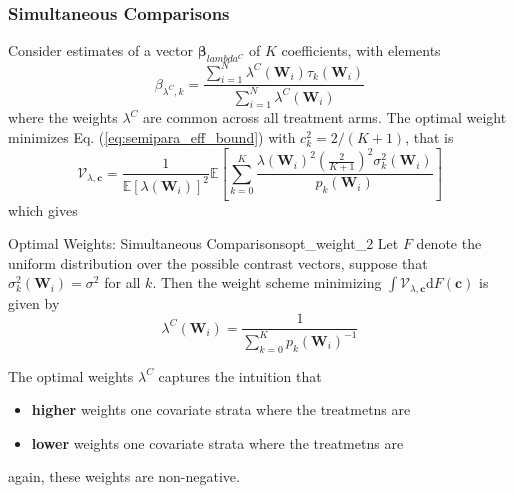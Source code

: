 \documentclass[twoside]{article}
\begin{document}
\subsubsection{Simultaneous Comparisons}
Consider estimates of a vector $\boldsymbol{\beta}_{lambda^C}$ of $K$ coefficients, with elements
$$
\beta_{\lambda^C,k} = \frac{\sum^N_{i=1}\lambda^C(\mathbf{W}_i)\tau_k(\mathbf{W}_i)}{\sum^N_{i=1}\lambda^C(\mathbf{W}_i)}
$$
where the weights $\lambda^C$ are common across all treatment arms. The optimal weight minimizes Eq. (\ref{eq:semipara_eff_bound}) with $c_k^2 = 2/(K+1)$, that is 
$$
\mathcal{V}_{\lambda,\mathbf{c}} = \frac{1}{\mathbb{E}\left[\lambda(\mathbf{W}_i)\right]^2} \mathbb{E}\left[ \sum^K_{k=0} \frac{\lambda(\mathbf{W}_i)^2 \left(\frac{2}{K+1}\right)^2 \sigma^2_k (\mathbf{W}_i) }{p_k(\mathbf{W}_i)} \right]
$$
which gives
\begin{corollary}{Optimal Weights: Simultaneous Comparisons}{opt_weight_2}
    Let $F$ denote the uniform distribution over the possible contrast vectors, suppose that $\sigma^2_k(\mathbf{W}_i) = \sigma^2$ for all $k$. Then the weight scheme minimizing $\int \mathcal{V}_{\lambda,\mathbf{c}}\mathrm{d}F(\mathbf{c})$ is given by 
    \begin{equation}
        \lambda^C(\mathbf{W}_i) = \frac{1}{\sum^K_{k=0}p_k (\mathbf{W}_i)^{-1}}
    \end{equation}
\end{corollary}
The optimal weights $\lambda^C$ captures the intuition that
\begin{itemize}
    \item \textcolor{myblue}{\textbf{higher}} weights one covariate strata where the treatmetns are 
    \item \textcolor{myred}{\textbf{lower}} weights one covariate strata where the treatmetns are 
\end{itemize}
again, these weights are non-negative.
\end{document}
